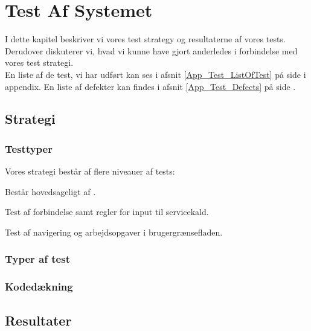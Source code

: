 \chapter{Test Af Systemet}
\label{Test}
I dette kapitel beskriver vi vores test strategy og resultaterne af vores tests. Derudover diskuterer vi, hvad vi kunne have gjort anderledes i forbindelse med vores test strategi.
\\En liste af de test, vi har udført kan ses i afsnit \ref{App_Test_ListOfTest} på side \pageref{App_Test_ListOfTest} i appendix. En liste af defekter kan findes i afsnit \ref{App_Test_Defects} på side \pageref{App_Test_Defects}.
\section{Strategi}
\label{Test_Strat}

\subsection{Testtyper}
\label{Test_Strat_codetypes}
Vores strategi består af flere niveauer af tests:
\begin{my_itemize}
\item[Scenario] Består hovedsageligt af .
\item[Service] Test af forbindelse samt regler for input til servicekald.
\item[Brugergrænseflade] Test af navigering og arbejdsopgaver i brugergrænsefladen.
\end{my_itemize}

\subsubsection{}

\subsection{Typer af test}
\label{Test_Strat_types}

\subsection{Kodedækning}
\label{Test_Strat_coverage}

\section{Resultater}
\label{Test_Results}